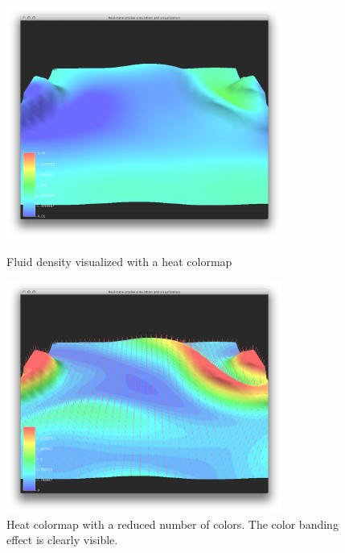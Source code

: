 \begin{figure}[htbp]
\centering
\begin{minipage}[t]{0.48\textwidth}
        \includegraphics[height=3in]{figures/heightplot/densityvelocity.png}
\caption{Fluid density visualized with a heat colormap}
\label{fig:heatmap}
\end{minipage}\hspace{.04\textwidth}%
\begin{minipage}[t]{0.48\textwidth}
        \includegraphics[height=3in]{figures/heightplot/densitynormals.png}
    \caption{Heat colormap with a reduced number of colors. The color banding effect is clearly visible.}
    \label{fig:banding}
\end{minipage}
\end{figure}

